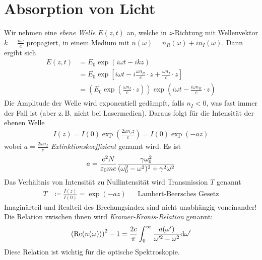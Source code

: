 \section{Absorption von Licht}
Wir nehmen eine \emph{ebene Welle $E(z,t)$} an, welche in $z$-Richtung
mit Wellenvektor $k=\frac{n\omega}{c}$ propagiert, in einem Medium mit
$n(\omega)=n_R(\omega)+in_I(\omega)$.
Dann ergibt sich
\begin{align*}
  E(z,t) &= E_0\exp(i\omega t-ikz) \\
         &= E_0\exp\left[
           i\omega t - i\frac{\omega n_R}{c}\cdot z 
           + \frac{\omega n_I}{c}\cdot z
           \right]\\
         &= \left( 
           E_0\exp\left(\frac{\omega n_I}{c}\cdot z\right)
           \right)
           \exp\left( i\omega t-\frac{i\omega n_R}{c}\cdot z\right)
\end{align*}
Die Amplitude der Welle wird exponentiell gedämpft, falls $n_I<0$, was
fast immer der Fall ist (aber z.\,B. nicht bei Lasermedien). Daraus
folgt für die Intensität der ebenen Welle
\begin{gather*}
  I(z) = I(0)\exp\left(\frac{2\omega n_I z}{c}\right)
  = I(0) \exp(-az)
\end{gather*}
wobei $a=\frac{2\omega n_I}{c}$
\emph{Extinktionskoeffizient}%
%
genannt wird. Es ist
\begin{gather*}
  a = \frac{e^2N}{\varepsilon_0 mc}        
  \frac{\gamma\omega_0^2}{(\omega_0^2-\omega^2)^2 + \gamma^2\omega^2}
\end{gather*}
Das Verhältnis von Intensität zu Nullintensität wird 
Transmission $T$%
%
%
genannt
\begin{align*}
  T &\coloneqq \frac{I(z)}{I(0)} = \exp(-az)
  &&\text{Lambert-Beersches Gesetz}
\end{align*}
 Imaginärteil und Realteil des Brechungsindex sind nicht
unabhängig voneinander! Die Relation zwischen ihnen wird
\emph{Kramer-Kronis-Relation}
genannt:
\begin{gather*}
  \left(\operatorname{Re}(n(\omega))\right)^2 - 1
  = \frac{2c}{\pi} \int_0^\infty
  \frac{a(\omega')}{\omega'^2-\omega^2}\mathrm{d} \omega'
\end{gather*}
Diese Relation ist wichtig für die optische Spektroskopie.

